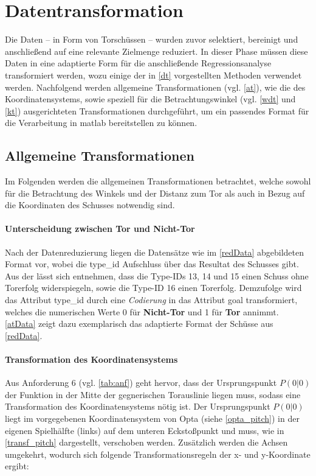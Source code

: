 \section{Datentransformation}
\label{dt}
Die Daten -- in Form von Torschüssen -- wurden zuvor selektiert, bereinigt und anschließend auf eine relevante Zielmenge reduziert. In dieser Phase müssen diese Daten in eine adaptierte Form für die anschließende Regressionsanalyse transformiert werden, wozu einige der in \vref{dt} vorgestellten Methoden verwendet werden. Nachfolgend werden allgemeine Transformationen (vgl. \vref{at}), wie die des Koordinatensystems, sowie speziell für die Betrachtungswinkel (vgl. \vref{wdt} und \vref{kt}) ausgerichteten Transformationen durchgeführt, um ein passendes Format für die Verarbeitung in \gls{matlab} bereitstellen zu können.


\subsection{Allgemeine Transformationen}
\label{at}
Im Folgenden werden die allgemeinen Transformationen betrachtet, welche sowohl für die Betrachtung des Winkels und der Distanz zum Tor als auch in Bezug auf die Koordinaten des Schusses notwendig sind.

\paragraph{Unterscheidung zwischen Tor und Nicht-Tor} Nach der Datenreduzierung liegen die Datensätze wie im \vref{redData} abgebildeten Format vor, wobei die \textsf{type\_id} Aufschluss über das Resultat des Schusses gibt. Aus der  lässt sich entnehmen, dass die Type-IDs \textsf{13, 14} und \textsf{15} einen Schuss ohne Torerfolg widerspiegeln, sowie die Type-ID \textsf{16} einen Torerfolg. Demzufolge wird das Attribut \textsf{type\_id} durch eine \textit{Codierung} in das Attribut \textsf{goal} transformiert, welches die numerischen Werte \textsf{0} für \textbf{Nicht-Tor} und \textsf{1} für \textbf{Tor} annimmt. \vref{atData} zeigt dazu exemplarisch das adaptierte Format der Schüsse aus \vref{redData}.

\paragraph{Transformation des Koordinatensystems}
Aus Anforderung 6 (vgl. \vref{tab:anf}) geht hervor, dass der Ursprungspunkt $P(0|0)$ der Funktion in der Mitte der gegnerischen Torauslinie liegen muss, sodass eine Transformation des Koordinatensystems nötig ist. Der Ursprungspunkt $P(0|0)$ liegt im  vorgegebenen Koordinatensystem von Opta (siehe \vref{opta_pitch}) in der eigenen Spielhälfte (links) auf dem unteren Eckstoßpunkt und muss, wie in \vref{transf_pitch} dargestellt, verschoben werden. Zusätzlich werden die Achsen umgekehrt, wodurch sich folgende Transformationsregeln der x- und y-Koordinate ergibt:\enlargethispage{\baselineskip}\newline

